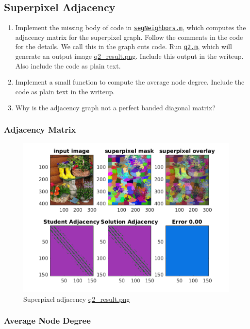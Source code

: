 \subsection{Superpixel Adjacency}
\begin{enumerate}
    \item Implement the missing body of code in \href{./hw5/segNeighbors.m}{\texttt{segNeighbors.m}}, which computes the adjacency matrix for the superpixel     graph.
    Follow the comments in the code for the details.
    We call this in the graph cuts code.
    Run \href{./hw5/q2.m}{\texttt{q2.m}}, which will generate an output image \href{./hw5/q2_result.png}{q2\_result.png}.
    Include this output in the writeup.
    Also include the code as plain text.
    \item Implement a small function to compute the average node degree.
    Include the code as plain text in the writeup.
    \item Why is the adjacency graph not a perfect banded diagonal matrix?
\end{enumerate}
\subsubsection{Adjacency Matrix}

\begin{figure}[htbp]
	\centering
	\includegraphics[width=\textwidth]{hw5/q2_result.png}
    \caption{Superpixel adjacency \href{./hw5/q2_result.png}{q2\_result.png}}
    \label{fig:18}
\end{figure}
\subsubsection{Average Node Degree}

